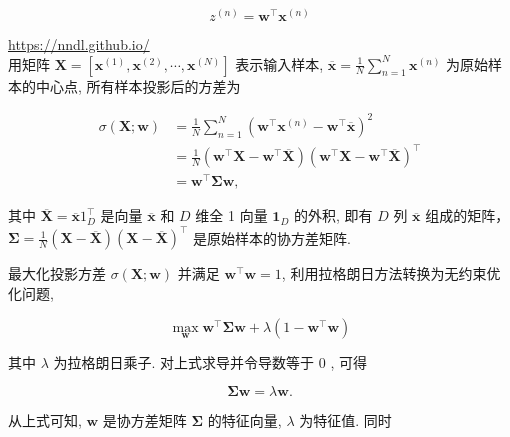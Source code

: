 \documentclass[10pt]{article}
\begin{document}
\begin{equation*}
z^{(n)}=\boldsymbol{w}^{\top} \boldsymbol{x}^{(n)} \tag{9.1}
\end{equation*}


\href{https://nndl.github.io/}{https://nndl.github.io/}\\
用矩阵 $\boldsymbol{X}=\left[\boldsymbol{x}^{(1)}, \boldsymbol{x}^{(2)}, \cdots, \boldsymbol{x}^{(N)}\right]$ 表示输入样本, $\overline{\boldsymbol{x}}=\frac{1}{N} \sum_{n=1}^{N} \boldsymbol{x}^{(n)}$ 为原始样本的中心点, 所有样本投影后的方差为


\begin{align*}
\sigma(\boldsymbol{X} ; \boldsymbol{w}) & =\frac{1}{N} \sum_{n=1}^{N}\left(\boldsymbol{w}^{\top} \boldsymbol{x}^{(n)}-\boldsymbol{w}^{\top} \overline{\boldsymbol{x}}\right)^{2}  \tag{9.2}\\
& =\frac{1}{N}\left(\boldsymbol{w}^{\top} \boldsymbol{X}-\boldsymbol{w}^{\top} \overline{\boldsymbol{X}}\right)\left(\boldsymbol{w}^{\top} \boldsymbol{X}-\boldsymbol{w}^{\top} \overline{\boldsymbol{X}}\right)^{\top}  \tag{9.3}\\
& =\boldsymbol{w}^{\top} \boldsymbol{\Sigma} \boldsymbol{w}, \tag{9.4}
\end{align*}


其中 $\overline{\boldsymbol{X}}=\overline{\boldsymbol{x}} 1_{D}^{\top}$ 是向量 $\overline{\boldsymbol{x}}$ 和 $D$ 维全 1 向量 $\mathbf{1}_{D}$ 的外积, 即有 $D$ 列 $\overline{\boldsymbol{x}}$ 组成的矩阵， $\boldsymbol{\Sigma}=\frac{1}{N}(\boldsymbol{X}-\overline{\boldsymbol{X}})(\boldsymbol{X}-\overline{\boldsymbol{X}})^{\top}$ 是原始样本的协方差矩阵.

最大化投影方差 $\sigma(\boldsymbol{X} ; \boldsymbol{w})$ 并满足 $\boldsymbol{w}^{\top} \boldsymbol{w}=1$, 利用拉格朗日方法转换为无约束优化问题,


\begin{equation*}
\max _{\boldsymbol{w}} \boldsymbol{w}^{\top} \boldsymbol{\Sigma} \boldsymbol{w}+\lambda\left(1-\boldsymbol{w}^{\top} \boldsymbol{w}\right) \tag{9.5}
\end{equation*}


其中 $\lambda$ 为拉格朗日乘子. 对上式求导并令导数等于 0 , 可得


\begin{equation*}
\boldsymbol{\Sigma} \boldsymbol{w}=\lambda \boldsymbol{w} . \tag{9.6}
\end{equation*}


从上式可知, $\boldsymbol{w}$ 是协方差矩阵 $\boldsymbol{\Sigma}$ 的特征向量, $\lambda$ 为特征值. 同时
\end{document}
